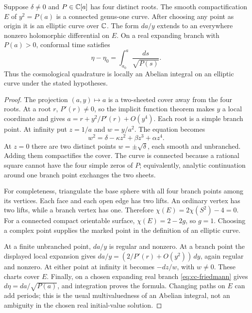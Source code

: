 \begin{theorem}
\label{thm:cc-elliptic}
Suppose $\delta\ne0$ and $P\in\mathbb{C}[a]$ has four distinct roots. The smooth
compactification $E$ of $y^2=P(a)$ is a connected genus-one curve. After
choosing any point as origin it is an elliptic curve over $\mathbb{C}$. The form
$da/y$ extends to an everywhere nonzero holomorphic differential on $E$.
On a real expanding branch with $P(a)>0$, conformal time satisfies
\[
 \eta-\eta_0=\int_{a_0}^{a}\frac{ds}{\sqrt{P(s)}}.
\]
Thus the cosmological quadrature is locally an Abelian integral on an
elliptic curve under the stated hypotheses.
\end{theorem}

\begin{proof}
The projection $(a,y)\mapsto a$ is a two-sheeted cover away from the four
roots. At a root $r$, $P'(r)\ne0$, so the implicit function theorem makes
$y$ a local coordinate and gives
$a=r+y^2/P'(r)+O(y^4)$. Each root is a simple branch point. At infinity
put $z=1/a$ and $w=y/a^2$. The equation becomes
\[
 w^2=\delta-\kappa z^2+\beta z^3+\alpha z^4.
\]
At $z=0$ there are two distinct points $w=\pm\sqrt\delta$, each smooth
and unbranched. Adding them compactifies the cover. The curve is connected
because a rational square cannot have the four simple zeros of $P$;
equivalently, analytic continuation around one branch point exchanges the
two sheets.

For completeness, triangulate the base sphere with all four branch points
among its vertices. Each face and each open edge has two lifts. An ordinary
vertex has two lifts, while a branch vertex has one. Therefore
$\chi(E)=2\chi(S^2)-4=0$. For a connected compact orientable surface,
$\chi(E)=2-2g$, so $g=1$. Choosing a complex point supplies the marked
point in the definition of an elliptic curve.

At a finite unbranched point, $da/y$ is regular and nonzero. At a branch
point the displayed local expansion gives
$da/y=(2/P'(r)+O(y^2))\,dy$, again regular and nonzero. At either point
at infinity it becomes $-dz/w$, with $w\ne0$. These charts cover $E$.
Finally, on a chosen expanding real branch \eqref{eq:cc-friedmann} gives
$d\eta=da/\sqrt{P(a)}$, and integration proves the formula. Changing paths
on $E$ can add periods; this is the usual multivaluedness of an Abelian
integral, not an ambiguity in the chosen real initial-value solution.
\end{proof}

